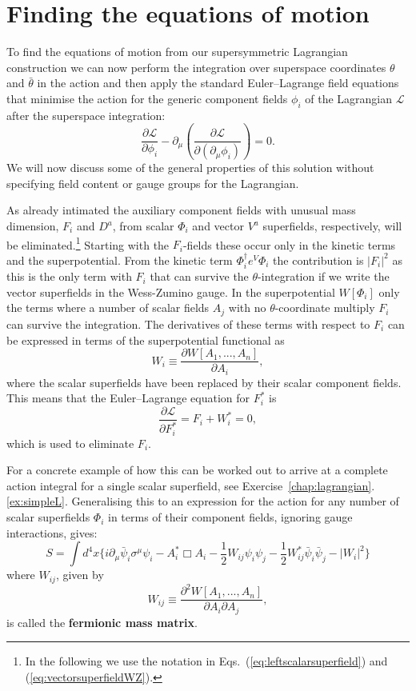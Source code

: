 \documentclass[notes.tex]{subfiles}
\begin{document}
\section{Finding the equations of motion}
\label{sec:eom}

To find the equations of motion from our supersymmetric Lagrangian construction we can now perform the integration over superspace coordinates $\theta$  and $\bar\theta$ in the action and then apply the standard Euler--Lagrange field equations that minimise the action for the generic component fields $\phi_i$ of the Lagrangian $\mathcal L$ after the superspace integration:
\begin{equation}
\frac{\partial\mathcal{L}}{\partial\phi_i}-\partial_\mu\left(\frac{\partial\mathcal{L}}{\partial(\partial_\mu\phi_i)}\right)=0.
\end{equation}
We will now discuss some of the general properties of this solution without specifying field content or gauge groups for the Lagrangian. 

As already intimated the auxiliary component fields with unusual mass dimension, $F_i$ and $D^a$, from scalar $\Phi_i$ and vector $V^a$ superfields, respectively, will be eliminated.\footnote{In the following we use the notation in Eqs.~(\ref{eq:leftscalarsuperfield}) and (\ref{eq:vectorsuperfieldWZ}).} 
Starting with the $F_i$-fields these occur only in the kinetic terms and the superpotential. From the kinetic term $\Phi^\dagger_i e^V \Phi_i$ the contribution is $|F_i|^2$ as this is the only term with $F_i$ that can survive the $\theta$-integration if we write the vector superfields in the Wess-Zumino gauge. In the superpotential $W[\Phi_i]$ only the terms where a number of scalar fields $A_j$ with no $\theta$-coordinate multiply $F_i$ can survive the integration. The derivatives of these terms with respect to $F_i$ can be expressed in terms of the superpotential functional as 
\begin{equation}
W_i \equiv \frac{\partial W[A_1, ... , A_n]}{\partial A_i},
\end{equation}
where the scalar superfields have been replaced by their scalar component fields. This means that the Euler--Lagrange equation for $F_i^*$ is
\[\frac{\partial \mathcal{L}}{\partial F_i^*} = F_i + W_i^* = 0,\]
which is used to eliminate $F_i$. 

For a concrete example of how this can be worked out to arrive at a complete action integral for a single scalar superfield, see Exercise~\ref{chap:lagrangian}.\ref{ex:simpleL}. Generalising this to an expression for the action for any number of scalar superfields $\Phi_i$ in terms of their component fields, ignoring gauge interactions, gives:
\[S = \int d^4x\{i\partial_\mu \bar{\psi}_i\sigma^\mu \psi_i - A^*_i\Box A_i -\frac{1}{2}W_{ij}\psi_i\psi_j - \frac{1}{2}W^*_{ij}\bar{\psi}_i\bar{\psi}_j - |W_i|^2\}\]
where $W_{ij}$, given by
\begin{equation}
W_{ij} \equiv \frac{\partial^2W[A_1, ...  ,A_n]}{\partial A_i \partial A_j},
\label{eq:fermionic_mass_matrix}
\end{equation}
is called the {\bf fermionic mass matrix}.
\end{document}
